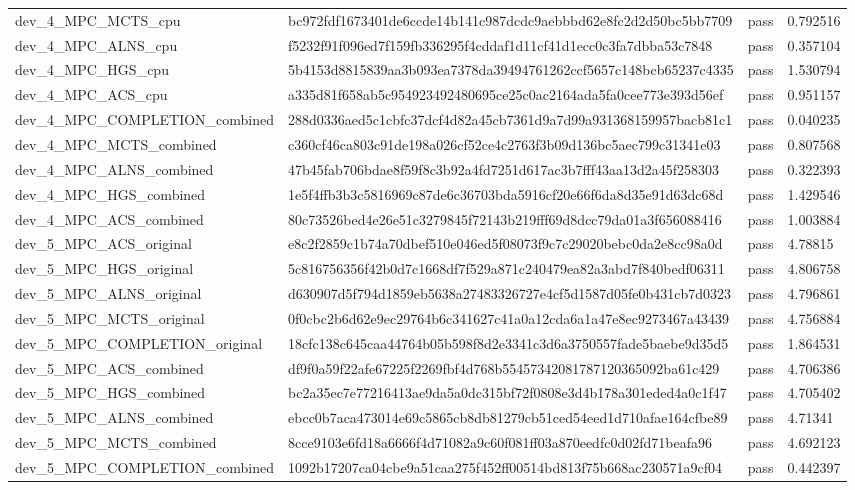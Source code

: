 \begin{tabular}{llll}
dev\_4\_MPC\_MCTS\_cpu & bc972fdf1673401de6ccde14b141c987dcdc9aebbbd62e8fc2d2d50bc5bb7709 & pass & 0.792516 \\
dev\_4\_MPC\_ALNS\_cpu & f5232f91f096ed7f159fb336295f4cddaf1d11cf41d1ecc0c3fa7dbba53c7848 & pass & 0.357104 \\
dev\_4\_MPC\_HGS\_cpu & 5b4153d8815839aa3b093ea7378da39494761262ccf5657c148bcb65237c4335 & pass & 1.530794 \\
dev\_4\_MPC\_ACS\_cpu & a335d81f658ab5c954923492480695ce25c0ac2164ada5fa0cee773e393d56ef & pass & 0.951157 \\
dev\_4\_MPC\_COMPLETION\_combined & 288d0336aed5c1cbfc37dcf4d82a45cb7361d9a7d99a931368159957bacb81c1 & pass & 0.040235 \\
dev\_4\_MPC\_MCTS\_combined & c360cf46ca803c91de198a026cf52ce4c2763f3b09d136bc5aec799c31341e03 & pass & 0.807568 \\
dev\_4\_MPC\_ALNS\_combined & 47b45fab706bdae8f59f8c3b92a4fd7251d617ac3b7fff43aa13d2a45f258303 & pass & 0.322393 \\
dev\_4\_MPC\_HGS\_combined & 1e5f4ffb3b3c5816969c87de6c36703bda5916cf20e66f6da8d35e91d63dc68d & pass & 1.429546 \\
dev\_4\_MPC\_ACS\_combined & 80c73526bed4e26e51c3279845f72143b219fff69d8dcc79da01a3f656088416 & pass & 1.003884 \\
dev\_5\_MPC\_ACS\_original & e8c2f2859c1b74a70dbef510e046ed5f08073f9c7c29020bebc0da2e8cc98a0d & pass & 4.78815 \\
dev\_5\_MPC\_HGS\_original & 5c816756356f42b0d7c1668df7f529a871c240479ea82a3abd7f840bedf06311 & pass & 4.806758 \\
dev\_5\_MPC\_ALNS\_original & d630907d5f794d1859eb5638a27483326727e4cf5d1587d05fe0b431cb7d0323 & pass & 4.796861 \\
dev\_5\_MPC\_MCTS\_original & 0f0cbc2b6d62e9ec29764b6c341627c41a0a12cda6a1a47e8ec9273467a43439 & pass & 4.756884 \\
dev\_5\_MPC\_COMPLETION\_original & 18cfc138c645caa44764b05b598f8d2e3341c3d6a3750557fade5baebe9d35d5 & pass & 1.864531 \\
dev\_5\_MPC\_ACS\_combined & df9f0a59f22afe67225f2269fbf4d768b55457342081787120365092ba61c429 & pass & 4.706386 \\
dev\_5\_MPC\_HGS\_combined & bc2a35ec7e77216413ae9da5a0dc315bf72f0808e3d4b178a301eded4a0c1f47 & pass & 4.705402 \\
dev\_5\_MPC\_ALNS\_combined & ebcc0b7aca473014e69c5865cb8db81279cb51ced54eed1d710afae164cfbe89 & pass & 4.71341 \\
dev\_5\_MPC\_MCTS\_combined & 8cce9103e6fd18a6666f4d71082a9c60f081ff03a870eedfc0d02fd71beafa96 & pass & 4.692123 \\
dev\_5\_MPC\_COMPLETION\_combined & 1092b17207ca04cbe9a51caa275f452ff00514bd813f75b668ac230571a9cf04 & pass & 0.442397 \\
\hline
\end{tabular}
